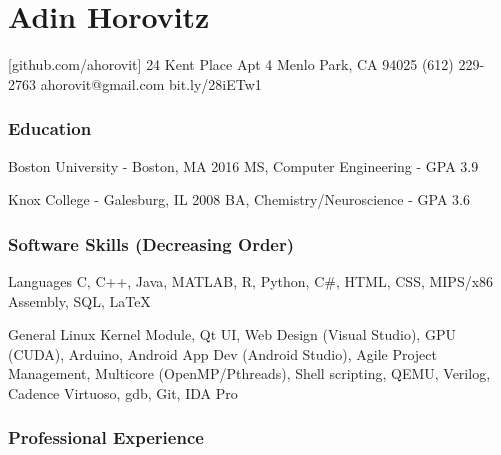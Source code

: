 \documentclass{tccv_AH}
\begin{document}
\sffamily

\part{Adin Horovitz}


\personal
    [github.com/ahorovit]
    {24 Kent Place Apt 4 \newline Menlo Park, CA 94025}
    {(612) 229-2763}
    {ahorovit@gmail.com}
    {bit.ly/28iETw1}



\section{Education}

\begin{yearlist}

\item[Boston University - Boston, MA]{2016}
     {MS, Computer Engineering - GPA 3.9}

\item[Knox College - Galesburg, IL]{2008}
     {BA, Chemistry/Neuroscience - GPA 3.6}

\end{yearlist}



\section{Software Skills \footnotesize{(Decreasing Order)}}

\begin{factlist}

\item{Languages}
     {C, C++, Java, MATLAB, R, Python, C\#, HTML, CSS, MIPS/x86 Assembly, SQL, \LaTeX}

\item{General}
     {Linux Kernel Module, Qt UI, Web Design (Visual Studio), GPU (CUDA), Arduino, Android App Dev (Android Studio), 
     Agile Project Management, Multicore (OpenMP/Pthreads), Shell scripting, QEMU, Verilog, Cadence Virtuoso, gdb, Git, IDA Pro}

\end{factlist}



\section{Professional Experience}
\end{document}
